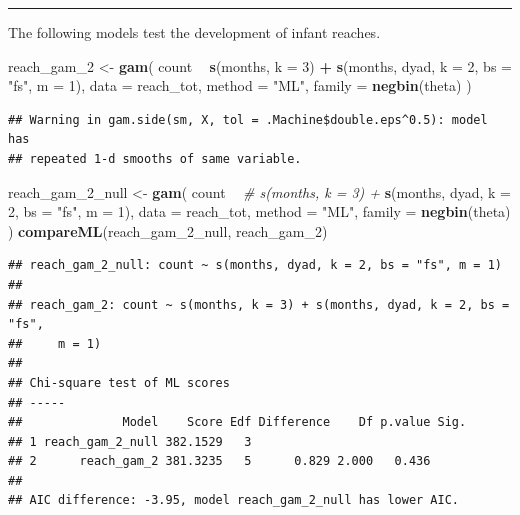 \documentclass[]{article}
\newenvironment{Shaded}{\begin{snugshade}}{\end{snugshade}}
\newcommand{\CommentTok}[1]{\textcolor[rgb]{0.56,0.35,0.01}{\textit{#1}}}
\newcommand{\DataTypeTok}[1]{\textcolor[rgb]{0.13,0.29,0.53}{#1}}
\newcommand{\DecValTok}[1]{\textcolor[rgb]{0.00,0.00,0.81}{#1}}
\newcommand{\KeywordTok}[1]{\textcolor[rgb]{0.13,0.29,0.53}{\textbf{#1}}}
\newcommand{\NormalTok}[1]{#1}
\newcommand{\OperatorTok}[1]{\textcolor[rgb]{0.81,0.36,0.00}{\textbf{#1}}}
\newcommand{\StringTok}[1]{\textcolor[rgb]{0.31,0.60,0.02}{#1}}
\begin{document}
\begin{center}\rule{0.5\linewidth}{\linethickness}\end{center}

The following models test the development of infant reaches.

\begin{Shaded}
\begin{Highlighting}[]
\NormalTok{reach_gam_}\DecValTok{2}\NormalTok{ <-}\StringTok{ }\KeywordTok{gam}\NormalTok{(}
\NormalTok{  count }\OperatorTok{~}
\StringTok{    }\KeywordTok{s}\NormalTok{(months, }\DataTypeTok{k =} \DecValTok{3}\NormalTok{) }\OperatorTok{+}
\StringTok{    }\KeywordTok{s}\NormalTok{(months, dyad, }\DataTypeTok{k =} \DecValTok{2}\NormalTok{, }\DataTypeTok{bs =} \StringTok{"fs"}\NormalTok{, }\DataTypeTok{m =} \DecValTok{1}\NormalTok{),}
  \DataTypeTok{data =}\NormalTok{ reach_tot,}
  \DataTypeTok{method =} \StringTok{"ML"}\NormalTok{,}
  \DataTypeTok{family =} \KeywordTok{negbin}\NormalTok{(theta)}
\NormalTok{)}
\end{Highlighting}
\end{Shaded}

\begin{verbatim}
## Warning in gam.side(sm, X, tol = .Machine$double.eps^0.5): model has
## repeated 1-d smooths of same variable.
\end{verbatim}

\begin{Shaded}
\begin{Highlighting}[]
\NormalTok{reach_gam_}\DecValTok{2}\NormalTok{_null <-}\StringTok{ }\KeywordTok{gam}\NormalTok{(}
\NormalTok{  count }\OperatorTok{~}
\StringTok{    }\CommentTok{# s(months, k = 3) +}
\StringTok{    }\KeywordTok{s}\NormalTok{(months, dyad, }\DataTypeTok{k =} \DecValTok{2}\NormalTok{, }\DataTypeTok{bs =} \StringTok{"fs"}\NormalTok{, }\DataTypeTok{m =} \DecValTok{1}\NormalTok{),}
  \DataTypeTok{data =}\NormalTok{ reach_tot,}
  \DataTypeTok{method =} \StringTok{"ML"}\NormalTok{,}
  \DataTypeTok{family =} \KeywordTok{negbin}\NormalTok{(theta)}
\NormalTok{)}
\KeywordTok{compareML}\NormalTok{(reach_gam_}\DecValTok{2}\NormalTok{_null, reach_gam_}\DecValTok{2}\NormalTok{)}
\end{Highlighting}
\end{Shaded}

\begin{verbatim}
## reach_gam_2_null: count ~ s(months, dyad, k = 2, bs = "fs", m = 1)
## 
## reach_gam_2: count ~ s(months, k = 3) + s(months, dyad, k = 2, bs = "fs", 
##     m = 1)
## 
## Chi-square test of ML scores
## -----
##              Model    Score Edf Difference    Df p.value Sig.
## 1 reach_gam_2_null 382.1529   3                              
## 2      reach_gam_2 381.3235   5      0.829 2.000   0.436     
## 
## AIC difference: -3.95, model reach_gam_2_null has lower AIC.
\end{verbatim}
\end{document}

